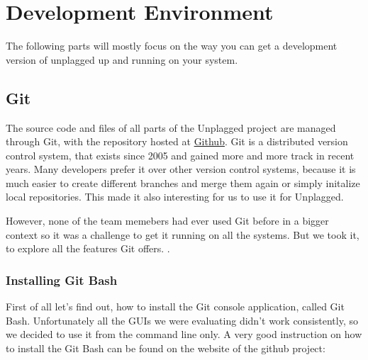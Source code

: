 \section{Development Environment}

The following parts will mostly focus on the way you can get a development version of unplagged up and running on your 
system.

\subsection{Git}
The source code and files of all parts of the Unplagged project are managed through Git, 
with the repository hosted at \href{https://github.com}{Github}. 
Git is a distributed version control system, that exists since 2005 and gained more and more 
track in recent years. Many developers prefer it over other version control systems, because it is much easier 
to create different branches and merge them again or simply initalize local repositories. This
made it also interesting for us to use it for Unplagged. %

However, none of the team memebers had ever used 
Git before in a bigger context so it was a challenge to get it running on all the systems. But we took it, to explore all the 
features Git offers. .




\subsubsection{Installing Git Bash}

First of all let's find out, how to install the Git console application, called Git Bash. 
Unfortunately all the GUIs we were evaluating didn't work consistently, so we decided to use it from the command line 
only. 
A very good instruction on how to install the Git Bash can be found on the website of the github project:

